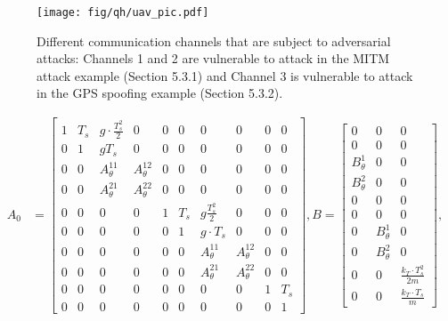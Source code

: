 \documentclass[twocolumn]{autart}    %
\newcommand{\rev}[1]{{\normalsize{{{\color{blue}#1}}}}}
\begin{document}
\begin{figure}
\center
\texttt{[image: fig/qh/uav\_pic.pdf]}
\caption{Different communication channels that are subject to adversarial attacks: \rev{Channels 1 and 2 are vulnerable to attack in the MITM attack example (Section 5.3.1) and Channel 3 is vulnerable to attack in the GPS spoofing example (Section 5.3.2).}
}
\label{fig:ex_uav_pic}
\end{figure}
\begin{figure*}[t]
\begin{equation}
\begin{aligned}
A_0 &= \begin{bmatrix} 1 & T_s &  g \cdot \frac {T_s^2} {2} & 0 		& 0 & 0 & 0 & 0 	& 0 &   0 \\
			      0 & 1 & g T_s & 0 				& 0 & 0 & 0 & 0 	& 0 &   0 \\
			      0 & 0 & A_\theta^{11} & A_\theta^{12} 			& 0 & 0 & 0 & 0 	& 0 &   0 \\
			      0 & 0 & A_\theta^{21} & A_\theta^{22}  			& 0 & 0 & 0 & 0 	& 0 &   0 \\
			      0 & 0 & 0 & 0 & 1 & T_s &  g\frac{T_s^2} {2} & 0	& 0 & 0 \\
			      0 & 0 & 0 & 0 & 0 & 1 & g \cdot T_s & 0  & 0 & 0 \\
			      0 & 0 & 0 & 0 & 0 & 0 &  A_\theta^{11} & A_\theta^{12} & 0 & 0 \\
			      0 & 0 & 0 & 0 & 0 & 0 &  A_\theta^{21} & A_\theta^{22}  & 0 & 0 \\
			      0 & 0 & 0 & 0 & 0 & 0 & 0 & 0 & 1 & T_s \\
			      0 & 0 & 0 & 0 & 0 & 0 & 0 & 0 & 0 & 1
	\end{bmatrix}, 
B = \begin{bmatrix}  
				0	& 	0	& 	0 \\
				0	& 	0	& 	0 \\
				B_\theta^1 & 0 & 0 \\
				B_\theta^2 & 0 & 0 \\
				0	& 	0	& 	0 \\
				0	& 	0	& 	0 \\
				0 &  B_\theta^1  & 0 \\
				0 &  B_\theta^2  & 0 \\
				0 & 0 & \frac {k_T \cdot T_s^2} {2m} \\
				0 & 0 & \frac {k_T \cdot T_s} {m}
	\end{bmatrix}, \\

\end{aligned}
\end{equation}
\end{figure*}
\end{document}
